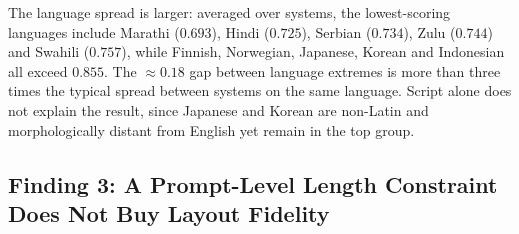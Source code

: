\begin{table}[H]
    \centering
    \small
    \caption{COMET-DA (chrF++ in parentheses) by target language $\times$
    system for representative languages. Full results are in
    Table~\ref{tab:appendix-comet-full}.}
    \label{tab:comet-per-lang}
    \setlength{\tabcolsep}{4pt}
\end{table}

The language spread is larger: averaged over systems, the lowest-scoring
languages include Marathi ($0.693$), Hindi ($0.725$), Serbian ($0.734$), Zulu
($0.744$) and Swahili ($0.757$), while Finnish, Norwegian, Japanese, Korean and
Indonesian all exceed $0.855$. The $\approx0.18$ gap between language extremes
is more than three times the typical spread between systems on the same
language. Script alone does not explain the result, since Japanese and Korean
are non-Latin and morphologically distant from English yet remain in the top
group.

\subsection{Finding 3: A Prompt-Level Length Constraint Does Not Buy Layout
Fidelity}
\label{subsec:res-compliance}

